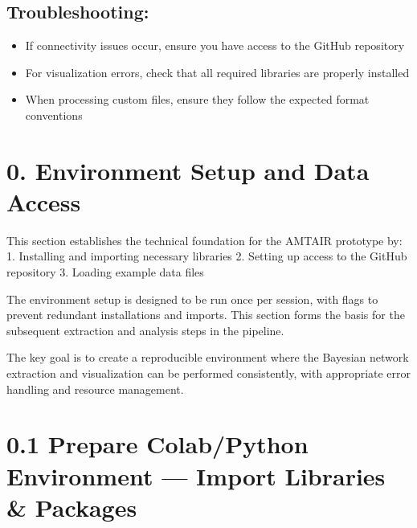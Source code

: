 \documentclass[
  11pt,
  letterpaper,
]{book}
\providecommand{\tightlist}{%
  \setlength{\itemsep}{0pt}\setlength{\parskip}{0pt}}
\begin{document}
\section{Troubleshooting:}\label{troubleshooting}

\begin{itemize}
\tightlist
\item
  If connectivity issues occur, ensure you have access to the GitHub
  repository
\item
  For visualization errors, check that all required libraries are
  properly installed
\item
  When processing custom files, ensure they follow the expected format
  conventions
\end{itemize}

\chapter{0. Environment Setup and Data
Access}\label{environment-setup-and-data-access}

This section establishes the technical foundation for the AMTAIR
prototype by: 1. Installing and importing necessary libraries 2. Setting
up access to the GitHub repository 3. Loading example data files

The environment setup is designed to be run once per session, with flags
to prevent redundant installations and imports. This section forms the
basis for the subsequent extraction and analysis steps in the pipeline.

The key goal is to create a reproducible environment where the Bayesian
network extraction and visualization can be performed consistently, with
appropriate error handling and resource management.

\chapter{0.1 Prepare Colab/Python Environment --- Import Libraries \&
Packages}\label{prepare-colabpython-environment-import-libraries-packages}
\end{document}
